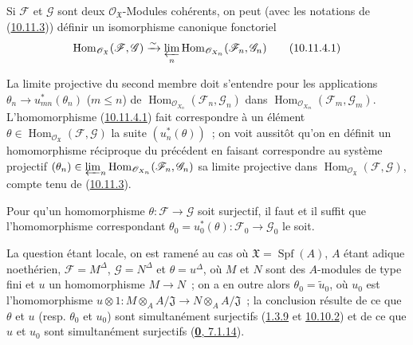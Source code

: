 \begin{corollary}[10.11.4]
\label{I.10.11.4-fr}
Si $\mathscr{F}$ et $\mathscr{G}$ sont deux
$\mathscr{O}_{\mathfrak{X}}$-Modules cohérents, on peut \textup{(avec les
notations de (\hyperref[I.10.11.3-fr]{10.11.3}))} définir un
isomorphisme canonique fonctoriel
\[
  \label{I.10.11.4.1-fr}
  \operatorname{Hom}_{\mathscr{O}_{\mathfrak{X}}}
  (\mathscr{F},\mathscr{G})
  \xrightarrow{\sim}
  \varprojlim_n
  \operatorname{Hom}_{\mathscr{O}_{X_n}}
  (\mathscr{F}_n,\mathscr{G}_n)
  \tag{10.11.4.1}
\]
\end{corollary}

La limite projective du second membre doit s'entendre pour les
applications
$\theta_n\to u_{mn}^*(\theta_n)$ ($m\leq n$) de
$\operatorname{Hom}_{\mathscr{O}_{X_n}}
(\mathscr{F}_n,\mathscr{G}_n)$ dans
$\operatorname{Hom}_{\mathscr{O}_{X_m}}
(\mathscr{F}_m,\mathscr{G}_m)$. L'homomorphisme
(\hyperref[I.10.11.4.1-fr]{10.11.4.1}) fait correspondre à un élément
$\theta\in\operatorname{Hom}_{\mathscr{O}_{\mathfrak{X}}}
(\mathscr{F},\mathscr{G})$ la suite $(u_n^*(\theta))$~; on voit
aussitôt qu'on en définit un homomorphisme réciproque du précédent en
faisant correspondre au système projectif
$(\theta_n)\in\varprojlim_n
\operatorname{Hom}_{\mathscr{O}_{X_n}}
(\mathscr{F}_n,\mathscr{G}_n)$
sa limite projective dans
$\operatorname{Hom}_{\mathscr{O}_{\mathfrak{X}}}
(\mathscr{F},\mathscr{G})$, compte tenu de
(\hyperref[I.10.11.3-fr]{10.11.3}).

\begin{corollary}[10.11.5]
\label{I.10.11.5-fr}
Pour qu'un homomorphisme $\theta:\mathscr{F}\to\mathscr{G}$ soit
surjectif, il faut et il suffit que l'homomorphisme correspondant
$\theta_0=u_0^*(\theta):\mathscr{F}_0\to\mathscr{G}_0$ le soit.
\end{corollary}

La question étant locale, on est ramené au cas où
$\mathfrak{X}=\operatorname{Spf}(A)$, $A$ étant adique noethérien,
$\mathscr{F}=M^\Delta$, $\mathscr{G}=N^\Delta$ et $\theta=u^\Delta$,
où $M$ et $N$ sont des $A$-modules de type fini et $u$ un
homomorphisme $M\to N$~; on a en outre alors
$\theta_0=\widetilde{u}_0$, où $u_0$ est l'homomorphisme
$u\otimes1:M\otimes_A A/\mathfrak{J}\to
N\otimes_A A/\mathfrak{J}$~;
la conclusion résulte de ce que $\theta$ et $u$ (resp. $\theta_0$ et
$u_0$) sont simultanément surjectifs
(\hyperref[I.1.3.9-fr]{1.3.9} et
\hyperref[I.10.10.2-fr]{10.10.2}) et de ce que $u$ et $u_0$ sont
simultanément surjectifs (\hyperref[0.7.1.14-fr]{\textbf{0}, 7.1.14}).

